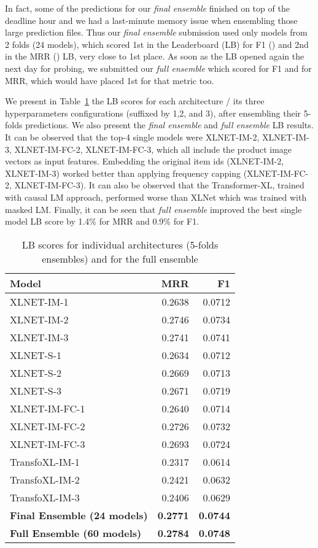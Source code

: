 \documentclass[sigconf,screen]{acmart}
\begin{document}
In fact, some of the predictions for our \emph{final ensemble} finished on top of the deadline hour and we had a last-minute memory issue when ensembling those large prediction files. Thus our \emph{final ensemble} submission used only models from 2 folds (24 models), which scored 1st in the Leaderboard (LB) for F1 () and 2nd in the MRR () LB, very close to 1st place. As soon as the LB opened again the next day for probing, we submitted our \emph{full ensemble} which scored  for F1 and  for MRR, which would have placed 1st for that metric too. 

We present in Table~\ref{tab:model_resuls}  the LB scores for each architecture / its three hyperparameters configurations (suffixed by 1,2, and 3), after ensembling their 5-folds predictions. We also present the \emph{final ensemble} and \emph{full ensemble} LB results. It can be observed that the top-4 single models were XLNET-IM-2, XLNET-IM-3, XLNET-IM-FC-2, XLNET-IM-FC-3, which all include the product image vectors as input features. Embedding the original item ids (XLNET-IM-2, XLNET-IM-3) worked better than applying frequency capping (XLNET-IM-FC-2, XLNET-IM-FC-3). It can also be observed that the Transformer-XL, trained with causal LM approach, performed worse than XLNet which was trained with masked LM. Finally, it can be seen that \emph{full ensemble} improved the best single model LB score by 1.4\% for MRR and 0.9\% for F1.

\begin{table}[ht]
\caption{LB scores for individual architectures (5-folds ensembles) and for the full ensemble}
\footnotesize
\begin{tabular}{lrr}
Model & MRR & F1 \\ \hline
XLNET-IM-1     & 0.2638               & 0.0712 \\
XLNET-IM-2     & 0.2746               & 0.0734 \\
XLNET-IM-3     & 0.2741               & 0.0741 \\ \hline
XLNET-S-1      & 0.2634               & 0.0712 \\
XLNET-S-2      & 0.2669               & 0.0713 \\
XLNET-S-3      & 0.2671               & 0.0719  \\ \hline
XLNET-IM-FC-1  & 0.2640               & 0.0714   \\
XLNET-IM-FC-2  & 0.2726               & 0.0732   \\
XLNET-IM-FC-3  & 0.2693               & 0.0724  \\ \hline
TransfoXL-IM-1 & 0.2317 & 0.0614  \\
TransfoXL-IM-2 & 0.2421 & 0.0632  \\
TransfoXL-IM-3 & 0.2406 & 0.0629 \\ \hline
\textbf{Final Ensemble (24 models)}  & \textbf{0.2771}               & \textbf{0.0744} \\ 
\textbf{Full Ensemble (60 models)}  & \textbf{0.2784}               & \textbf{0.0748} \\ \hline
\end{tabular}
\label{tab:model_resuls}

\end{table}
\end{document}
